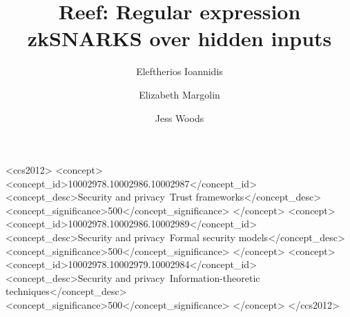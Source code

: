 \documentclass[sigconf, review]{acmart}
\begin{document}
\title{Reef: Regular expression zkSNARKS over hidden inputs}

\author{Eleftherios Ioannidis}

\author{Elizabeth Margolin}

\author{Jess Woods}

\renewcommand{\shortauthors}{Ioannidis et al.}



\begin{CCSXML}
<ccs2012>
<concept>
<concept_id>10002978.10002986.10002987</concept_id>
<concept_desc>Security and privacy~Trust frameworks</concept_desc>
<concept_significance>500</concept_significance>
</concept>
<concept>
<concept_id>10002978.10002986.10002989</concept_id>
<concept_desc>Security and privacy~Formal security models</concept_desc>
<concept_significance>500</concept_significance>
</concept>
<concept>
<concept_id>10002978.10002979.10002984</concept_id>
<concept_desc>Security and privacy~Information-theoretic techniques</concept_desc>
<concept_significance>500</concept_significance>
</concept>
</ccs2012>
\end{CCSXML}



\maketitle





\end{document}
